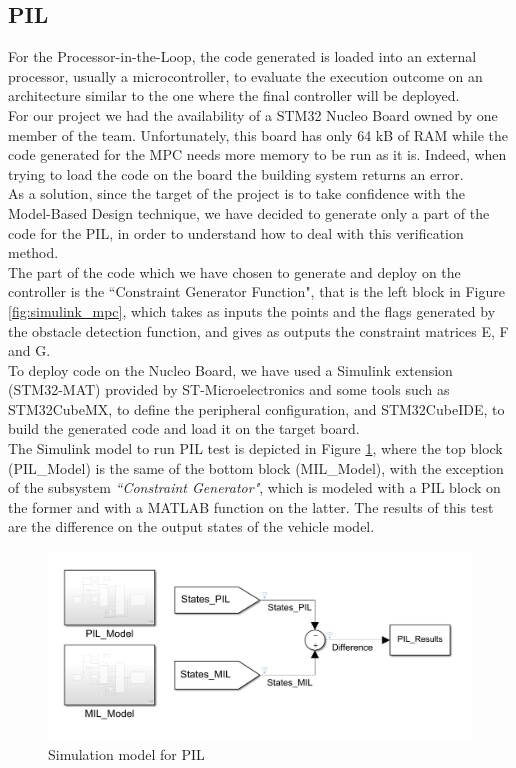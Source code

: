 \subsection{PIL} \label{subsection:PIL}
For the Processor-in-the-Loop, the code generated is loaded into an external processor, usually a microcontroller, to evaluate the execution outcome on an architecture similar to the one where the final controller will be deployed.\\
For our project we had the availability of a STM32 Nucleo Board owned by one member of the team. Unfortunately, this board has only 64 kB of RAM while the code generated for the MPC needs more memory to be run as it is. Indeed, when trying to load the code on the board the building system returns an error.\\
As a solution, since the target of the project is to take confidence with the Model-Based Design technique, we have decided to generate only a part of the code for the PIL, in order to understand how to deal with this verification method.\\
The part of the code which we have chosen to generate and deploy on the controller is the ``Constraint Generator Function", that is the left block in Figure \ref{fig:simulink_mpc}, which takes as inputs the points and the flags generated by the obstacle detection function, and gives as outputs the constraint matrices E, F and G.\\
To deploy code on the Nucleo Board, we have used a Simulink extension (STM32-MAT) provided by ST-Microelectronics and some tools such as STM32CubeMX, to define the peripheral configuration, and STM32CubeIDE, to build the generated code and load it on the target board.\\
The Simulink model to run PIL test is depicted in Figure \ref{fig:PIL_Model}, where the top block (PIL\_Model) is the same of the bottom block (MIL\_Model), with the exception of the subsystem \textit{``Constraint Generator"}, which is modeled with a PIL block on the former and with a MATLAB function on the latter. The results of this test are the difference on the output states of the vehicle model.
\begin{figure}[H]
    \centering
    \includegraphics[width=1\textwidth,keepaspectratio]{Figures/PIL_Model.jpg}
    \caption{Simulation model for PIL}
    \label{fig:PIL_Model}
\end{figure}
